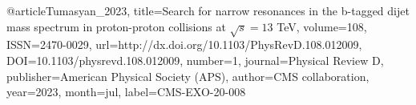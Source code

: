 @article{Tumasyan_2023,
	 title={Search for narrow resonances in the b-tagged dijet mass spectrum in proton-proton collisions at $\sqrt{s}=13$ TeV},
		 volume={108},
		 ISSN={2470-0029},
		 url={http://dx.doi.org/10.1103/PhysRevD.108.012009},
			 DOI={10.1103/physrevd.108.012009},
		 number={1},
		 journal={Physical Review D},
		 publisher={American Physical Society (APS)},
		 author={CMS collaboration},
		 year={2023},
		 month=jul,
		 label={CMS-EXO-20-008}
}
